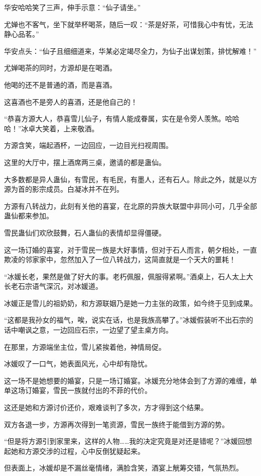 \begin{this_body}
华安哈哈笑了三声，伸手示意：“仙子请坐。”

尤婵也不客气，坐下就举杯喝茶，随后一叹：“茶是好茶，可惜我心中有忧，无法静心品茗。”

华安点头：“仙子且细细道来，华某必定竭尽全力，为仙子出谋划策，排忧解难！”

尤婵喝茶的同时，方源却是在喝酒。

他喝的还不是普通的酒，而是喜酒。

这喜酒也不是旁人的喜酒，还是他自己的！

“恭喜方源大人，恭喜雪儿仙子，有情人能成眷属，实在是令旁人羡煞。哈哈哈！”冰卓大笑着，上来敬酒。

方源含笑，端起酒杯，一边回应，一边目光扫视周围。

这里的大厅中，摆上酒席两三桌，邀请的都是蛊仙。

大多数都是异人蛊仙，有雪民，有毛民，有墨人，还有石人。除此之外，就是以方源为首的影宗成员。白凝冰并不在列。

方源有八转战力，此刻有关他的喜宴，在北原的异族大联盟中非同小可，几乎全部蛊仙都来参加。

雪民蛊仙们欢欣鼓舞，石人蛊仙的表情却显得僵硬。

这一场订婚的喜宴，对于雪民一族是大好事情，但对于石人而言，朝夕相处，一直欺凌的邻家家中，忽然加入了一位八转战力，这简直就是一个天大的噩耗！

“冰媛长老，果然是做了好大的事。老朽佩服，佩服得紧啊。”酒桌上，石人太上大长老石宗语气深沉，对冰媛道。

冰媛正是雪儿的祖奶奶，和方源联姻乃是她一力主张的政策，如今终于见到成果。

“这都是我孙女的福气，唉，说实在话，也是我族高攀了。”冰媛假装听不出石宗的话中嘲讽之意，一边回应石宗，一边望了望主桌方向。

在那里，方源端坐主位，雪儿紧挨着他，神情局促。

冰媛叹了一口气，她表面风光，心中却有隐忧。

这一场不是她想要的婚宴，只是一场订婚宴。冰媛充分地体会到了方源的难缠，单单这场订婚宴，雪民一族就付出的不菲的代价。

这还是她和方源讨价还价，艰难谈判了多次，方才得到这个结果。

双方各退一步，方源再次得到一笔资源，雪民一族终于能借到方源的势。

“但是将方源引到家里来，这样的人物……我的决定究竟是对还是错呢？”冰媛回想起她和方源交涉的过程，心中反倒犹疑起来。

但表面上，冰媛却是不漏丝毫情绪，满脸含笑，酒宴上觥筹交错，气氛热烈。


\end{this_body}
